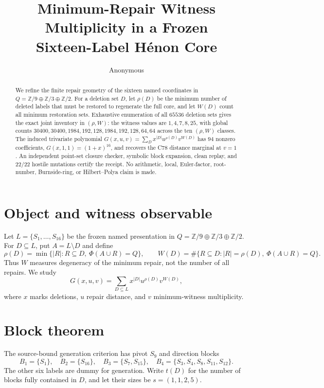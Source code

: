 \documentclass[10pt]{article}
\title{Minimum-Repair Witness Multiplicity in a Frozen\\
Sixteen-Label H\'enon Core}
\author{Anonymous}
\date{}
\newcommand{\Z}{\mathbb Z}
\newcommand{\Qcore}{Q}
\newcommand{\Phiop}{\Phi}
\begin{document}
\maketitle

\begin{abstract}
We refine the finite repair geometry of the sixteen named coordinates in
$\Qcore=\Z/9\oplus\Z/3\oplus\Z/2$.  For a deletion set $D$, let
$\rho(D)$ be the minimum number of deleted labels that must be restored to
regenerate the full core, and let $W(D)$ count all minimum restoration sets.
Exhaustive enumeration of all $65536$ deletion sets gives the exact joint
inventory in $(\rho,W)$: the witness values are
$1,4,7,8,25$, with global counts
$30400,30400,1984,192,128,1984,192,128,64,64$ across the ten
$(\rho,W)$ classes.  The induced trivariate polynomial
$G(x,u,v)=\sum_Dx^{|D|}u^{\rho(D)}v^{W(D)}$ has $94$ nonzero coefficients,
$G(x,1,1)=(1+x)^{16}$, and recovers the C78 distance marginal at $v=1$.
An independent point-set closure checker, symbolic block expansion, clean
replay, and $22/22$ hostile mutations certify the receipt.  No arithmetic,
local, Euler-factor, root-number, Burnside-ring, or Hilbert--Polya claim is
made.
\end{abstract}

\section{Object and witness observable}
Let $L=\{S_1,\ldots,S_{16}\}$ be the frozen named presentation in
$\Qcore=\Z/9\oplus\Z/3\oplus\Z/2$.  For $D\subseteq L$, put
$A=L\setminus D$ and define
\[
 \rho(D)=\min\{|R|:R\subseteq D,\ \Phiop(A\cup R)=\Qcore\},
 \qquad
 W(D)=\#\{R\subseteq D:|R|=\rho(D),\ \Phiop(A\cup R)=\Qcore\}.
\]
Thus $W$ measures degeneracy of the minimum repair, not the number of all
repairs.  We study
\begin{equation}
 G(x,u,v)=\sum_{D\subseteq L}x^{|D|}u^{\rho(D)}v^{W(D)},
 \label{eq:G}
\end{equation}
where $x$ marks deletions, $u$ repair distance, and $v$ minimum-witness
multiplicity.

\section{Block theorem}
The source-bound generation criterion has pivot $S_9$ and direction blocks
\[
 B_1=\{S_1\},\quad B_2=\{S_{16}\},\quad
 B_3=\{S_7,S_{15}\},\quad
 B_4=\{S_3,S_4,S_8,S_{11},S_{12}\}.
\]
The other six labels are dummy for generation.  Write $t(D)$ for the number
of blocks fully contained in $D$, and let their sizes be
$s=(1,1,2,5)$.
\end{document}
